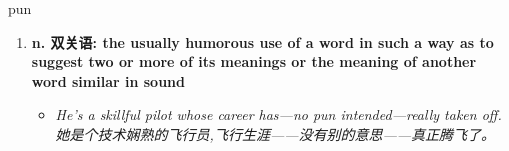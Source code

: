 
\begin{frame}
{\huge pun}
\begin{center}
\begin{enumerate}\Large
  \item \textbf{n. 双关语: the usually humorous use of a word in such a way as to suggest two or more of its meanings or the meaning of another word similar in sound}
  \begin{itemize}
    \item \em{\Large{He's a skillful pilot whose career has—no pun intended—really taken off. 她是个技术娴熟的飞行员,飞行生涯——没有别的意思——真正腾飞了。}}
  \end{itemize}
\end{enumerate}
\end{center}
\end{frame}
